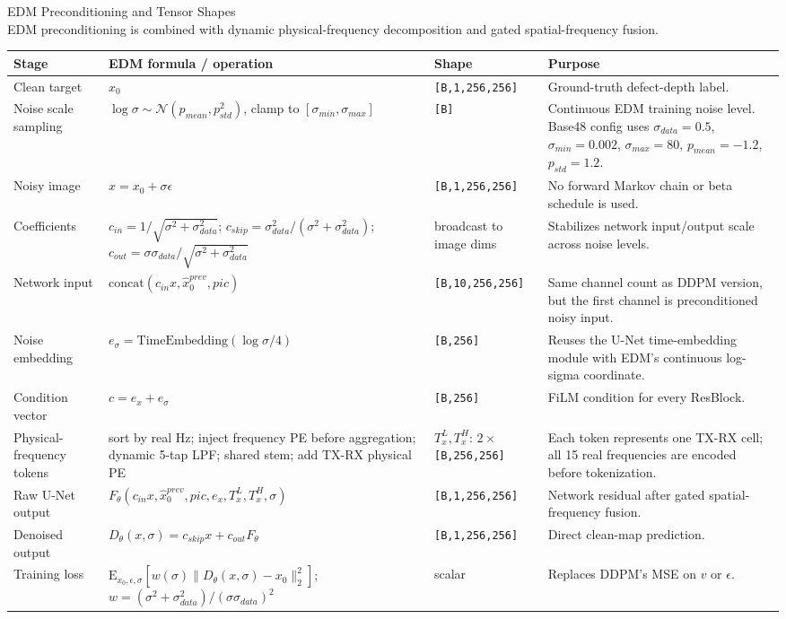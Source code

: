 \documentclass[10pt,landscape]{article}
\newcommand{\shape}[1]{\texttt{[#1]}}
\begin{document}
\begin{center}
{\Large EDM Preconditioning and Tensor Shapes}\\[1mm]
{\small EDM preconditioning is combined with dynamic physical-frequency decomposition and gated spatial-frequency fusion.}
\end{center}

\small
\begin{tabular}{>{\raggedright\arraybackslash}p{37mm} >{\raggedright\arraybackslash}p{77mm} >{\raggedright\arraybackslash}p{50mm} >{\raggedright\arraybackslash}p{232mm}}
\toprule
Stage & EDM formula / operation & Shape & Purpose \\
\midrule
Clean target & $x_0$ & \shape{B,1,256,256} & Ground-truth defect-depth label. \\
Noise scale sampling & $\log\sigma \sim \mathcal{N}(p_{mean},p_{std}^2)$, clamp to $[\sigma_{min},\sigma_{max}]$ & \shape{B} & Continuous EDM training noise level. Base48 config uses $\sigma_{data}=0.5$, $\sigma_{min}=0.002$, $\sigma_{max}=80$, $p_{mean}=-1.2$, $p_{std}=1.2$. \\
Noisy image & $x=x_0+\sigma\epsilon$ & \shape{B,1,256,256} & No forward Markov chain or beta schedule is used. \\
Coefficients & $c_{in}=1/\sqrt{\sigma^2+\sigma_{data}^2}$; $c_{skip}=\sigma_{data}^2/(\sigma^2+\sigma_{data}^2)$; $c_{out}=\sigma\sigma_{data}/\sqrt{\sigma^2+\sigma_{data}^2}$ & broadcast to image dims & Stabilizes network input/output scale across noise levels. \\
Network input & $\mathrm{concat}(c_{in}x,\hat{x}_0^{prev},pic)$ & \shape{B,10,256,256} & Same channel count as DDPM version, but the first channel is preconditioned noisy input. \\
Noise embedding & $e_\sigma=\mathrm{TimeEmbedding}(\log\sigma/4)$ & \shape{B,256} & Reuses the U-Net time-embedding module with EDM's continuous log-sigma coordinate. \\
Condition vector & $c=e_x+e_\sigma$ & \shape{B,256} & FiLM condition for every ResBlock. \\
Physical-frequency tokens & sort by real Hz; inject frequency PE before aggregation; dynamic 5-tap LPF; shared stem; add TX-RX physical PE & $T_x^L,T_x^H$: $2\times$\shape{B,256,256} & Each token represents one TX-RX cell; all 15 real frequencies are encoded before tokenization. \\
Raw U-Net output & $F_\theta(c_{in}x,\hat{x}_0^{prev},pic,e_x,T_x^L,T_x^H,\sigma)$ & \shape{B,1,256,256} & Network residual after gated spatial-frequency fusion. \\
Denoised output & $D_\theta(x,\sigma)=c_{skip}x+c_{out}F_\theta$ & \shape{B,1,256,256} & Direct clean-map prediction. \\
Training loss & $\mathrm{E}_{x_0,\epsilon,\sigma}\left[w(\sigma)\lVert D_\theta(x,\sigma)-x_0\rVert_2^2\right]$; $w=(\sigma^2+\sigma_{data}^2)/(\sigma\sigma_{data})^2$ & scalar & Replaces DDPM's MSE on $v$ or $\epsilon$. \\
\bottomrule
\end{tabular}
\end{document}

